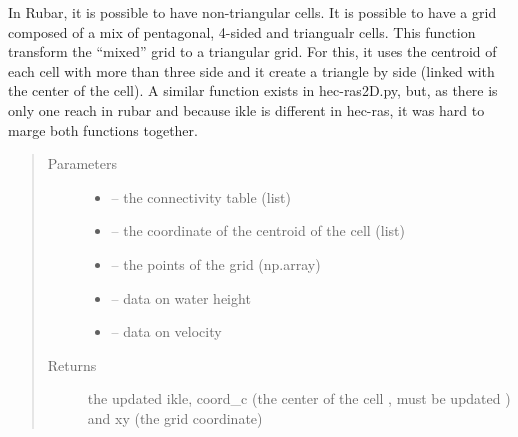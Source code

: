 \documentclass[letterpaper,10pt,english]{sphinxmanual}
\begin{document}
\begin{fulllineitems}
\label{\detokenize{index:src.rubar.get_triangular_grid}}
In Rubar, it is possible to have non-triangular cells. It is possible to have a grid composed of a mix
of pentagonal, 4-sided and triangualr cells. This function transform the ``mixed'' grid to a triangular grid. For this,
it uses the centroid of each cell with more than three side and it create a triangle by side (linked with the
center of the cell). A similar function exists in hec-ras2D.py, but, as there is only one reach in rubar
and because ikle is different in hec-ras, it was hard to marge both functions together.
\begin{quote}\begin{description}
\item[{Parameters}] \leavevmode\begin{itemize}
\item {} 
 -- the connectivity table (list)

\item {} 
 -- the coordinate of the centroid of the cell (list)

\item {} 
 -- the points of the grid (np.array)

\item {} 
 -- data on water height

\item {} 
 -- data on velocity

\end{itemize}

\item[{Returns}] \leavevmode
the updated ikle, coord\_c (the center of the cell , must be updated ) and xy (the grid coordinate)

\end{description}\end{quote}

\end{fulllineitems}

\end{document}

